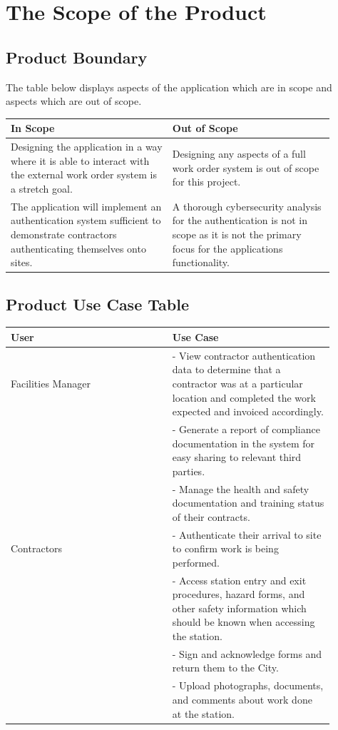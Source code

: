 \documentclass[12pt]{article}
\begin{document}
\section{The Scope of the Product}
\subsection{Product Boundary}

The table below displays aspects of the application which are in scope and
aspects which are out of scope. \\

\begin{tabular}{|p{0.45\linewidth}|p{0.45\linewidth}|}
  \hline
  \textbf{In Scope} & \textbf{Out of Scope} \\
  \hline
  Designing the application in a way where it is able to interact with the
  external work order system is a stretch goal.& Designing any aspects of a full
  work order system is out of scope for this project. \\
  \hline
  The application will implement an authentication system sufficient to
  demonstrate contractors authenticating themselves onto sites. & A thorough
  cybersecurity analysis for the authentication is not in scope as it is not the
  primary focus for the applications functionality. \\
  \hline
\end{tabular}

\subsection{Product Use Case Table}

\begin{tabular}{|p{0.45\linewidth}|p{0.45\linewidth}|}
  \hline
  \textbf{User}& \textbf{Use Case} \\
  \hline
  Facilities Manager & - View contractor authentication data to determine that
  a contractor was at a particular location and completed the work expected
  and invoiced accordingly. \\
  & - Generate a report of compliance documentation in the system for easy
  sharing to relevant third parties. \\
  & - Manage the health and safety documentation and training status of
  their contracts.\\
  \hline
  Contractors & - Authenticate their arrival to site to confirm work is being
  performed.\\
  & - Access station entry and exit procedures, hazard forms, and other safety
  information which should be known when accessing the station.\\
  & - Sign and acknowledge forms and return them to the City.\\
  & - Upload photographs, documents, and comments about work done at
  the station. \\
  \hline
\end{tabular}
\end{document}
